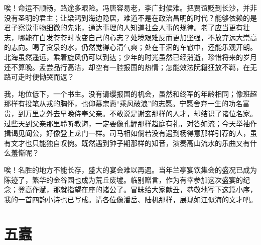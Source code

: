 \documentclass[12pt,UTF-8,openany,a4]{ctexbook}
\begin{document}
\begin{large}
    唉！命运不顺畅，路途多艰险。冯唐容易老，李广封侯难。把贾谊贬到长沙，并非没有圣明的君主；让梁鸿到海边隐居，难道不是在政治昌明的时代？能够依赖的是君子察觉事物细微的先兆，通达事理的人知道社会人事的规律。老了应当更有壮志，哪能在白发苍苍时改变自己的心志？处境艰难反而更加坚强，不放弃远大崇高的志向。喝了贪泉的水，仍然觉得心清气爽；处在干涸的车辙中，还能乐观开朗。北海虽然遥远，乘着旋风仍可以到达；少年的时光虽然已经消逝，珍惜将来的岁月还不算晚。孟尝品行高洁，却空有一腔报国的热情；怎能效法阮籍狂放不羁，在无路可走时便恸哭而返？
    
    我，地位低下，一个书生。没有请缨报国的机会，虽然和终军的年龄相同；像班超那样有投笔从戎的胸怀，也仰慕宗悫“乘风破浪”的志愿。宁愿舍弃一生的功名富贵，到万里之外去早晚侍奉父亲。不敢说是谢玄那样的人才，却结识了诸位名家。过些天到父亲那里聆听教诲，一定要像孔鲤那样趋庭有礼，对答如流；今天举袖作揖谒见阎公，好像登上龙门一样。司马相如倘若没有遇到杨得意那样引荐的人，虽有文才也只能独自叹惋。既然遇到钟子期那样的知音，演奏高山流水的乐曲又有什么羞惭呢？
    
    唉！名胜的地方不能长存，盛大的宴会难以再遇。当年兰亭宴饮集会的盛况已成为陈迹了，繁华的金谷园也成为荒丘废墟。临别赠言，作为有幸参加这次盛宴的纪念；登高作赋，那就指望在座的诸公了。冒昧给大家献丑，恭敬地写下这篇小序，我的一首四韵小诗也已写成。请各位像潘岳、陆机那样，展现如江似海的文才吧。
    

\end{large}



\chapter{五蠹}
\end{document}
